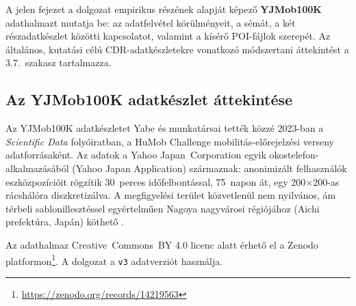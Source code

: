 
A jelen fejezet a dolgozat empirikus részének alapját képező \textbf{YJMob100K} \cite{yabe2023metropolitan} adathalmazt mutatja be: az adatfelvétel körülményeit, a sémát, a két részadatkészlet közötti kapcsolatot, valamint a kísérő POI-fájlok szerepét. Az általános, kutatási célú CDR-adatkészletekre vonatkozó módszertani áttekintést a 3.7.\ szakasz tartalmazza.

\subsection{Az YJMob100K adatkészlet áttekintése}

Az YJMob100K adatkészletet Yabe és munkatársai \cite{yabe2023metropolitan} tették közzé 2023-ban a \emph{Scientific Data} folyóiratban, a HuMob Challenge mobilitás-előrejelzési verseny adatforrásaként. Az adatok a Yahoo Japan~Corporation egyik okostelefon-alkalmazásából (Yahoo Japan Application) származnak: anonimizált felhasználók eszközpozícióit rögzítik 30~perces időfelbontással, 75~napon át, egy 200$\times$200-as rácshálóra diszkretizálva. A megfigyelési terület közvetlenül nem nyilvános, ám térbeli sablonillesztéssel egyértelműen Nagoya nagyvárosi régiójához (Aichi prefektúra, Japán) köthető \cite{pinter2024revealing}.

Az adathalmaz Creative~Commons~BY 4.0 licenc alatt érhető el a Zenodo platformon\footnote{\url{https://zenodo.org/records/14219563}}. A dolgozat a \texttt{v3} adatverziót használja.

